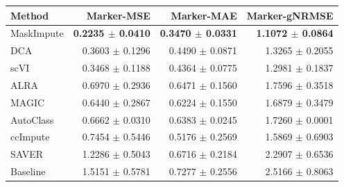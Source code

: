 \begin{tabular}{@{}lrrr@{}}
\toprule
Method & Marker-MSE & Marker-MAE & Marker-gNRMSE \\
\midrule
MaskImpute & \textbf{0.2235 $\pm$ 0.0410} & \textbf{0.3470 $\pm$ 0.0331} & \textbf{1.1072 $\pm$ 0.0864} \\
DCA & 0.3603 $\pm$ 0.1296 & 0.4490 $\pm$ 0.0871 & 1.3265 $\pm$ 0.2055 \\
scVI & 0.3468 $\pm$ 0.1188 & 0.4364 $\pm$ 0.0775 & 1.2981 $\pm$ 0.1837 \\
ALRA & 0.6970 $\pm$ 0.2936 & 0.6471 $\pm$ 0.1560 & 1.7596 $\pm$ 0.3518 \\
MAGIC & 0.6440 $\pm$ 0.2867 & 0.6224 $\pm$ 0.1550 & 1.6879 $\pm$ 0.3479 \\
AutoClass & 0.6662 $\pm$ 0.0310 & 0.6383 $\pm$ 0.0245 & 1.7260 $\pm$ 0.0001 \\
ccImpute & 0.7454 $\pm$ 0.5446 & 0.5176 $\pm$ 0.2569 & 1.5869 $\pm$ 0.6903 \\
SAVER & 1.2286 $\pm$ 0.5043 & 0.6716 $\pm$ 0.2184 & 2.2907 $\pm$ 0.6536 \\
Baseline & 1.5151 $\pm$ 0.5781 & 0.7277 $\pm$ 0.2556 & 2.5166 $\pm$ 0.8063 \\
\bottomrule
\end{tabular}
